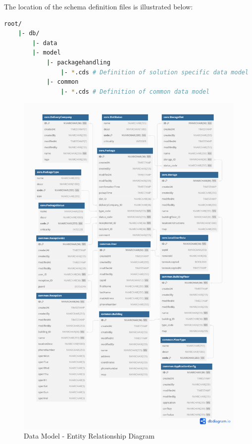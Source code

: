 The location of the schema definition files is illustrated below:
\begin{lstlisting}[language={bash}]
root/
    |- db/
        |- data
        |- model
            |- packagehandling 
                |- *.cds # Definition of solution specific data model
            |- common
                |- *.cds # Definition of common data model
\end{lstlisting}

\begin{figure}[H]
	\centering
	\includegraphics[width=1\linewidth]{images/DB/DB_Relationship.png}
	\caption{Data Model - Entity Relationship Diagram}
	\label{fig:db}
\end{figure}


